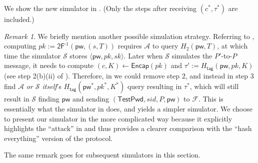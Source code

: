 \documentclass{article}
\theoremstyle{plain}
\theoremstyle{definition}
\theoremstyle{remark}
\newtheorem{remark}{Remark}
\newcommand{\adv}{\mathcal{A}}
\renewcommand{\sim}{\mathcal{S}}
\newcommand{\func}{\mathcal{F}}
\newcommand{\Encap}{\mathsf{Encap}}
\newcommand{\Htag}{H_\mathsf{tag}}
\newcommand{\pw}{\mathsf{pw}}
\newcommand{\TestPwd}{\mathsf{TestPwd}}
\begin{document}
We show the new simulator in . (Only the steps after receiving $(c^*,\tau^*)$ are included.)
\begin{remark}
We briefly mention another possible simulation strategy. Referring to , computing $pk := \mathsf{2F}^{\text{-}1}(\pw,(s,T))$ requires $\adv$ to query $H_2(\pw,T)$, at which time the simulator $\sim$ stores $\langle\pw,pk,sk\rangle$. Later when $\sim$ simulates the $P'$-to-$P$ message, it needs to compute $(c,K) \gets \Encap(pk)$ and $\tau' := \Htag(\pw,pk,K)$ (see step 2(b)(ii) of ). Therefore, in  we could remove step 2, and instead in step 3 find $\adv$ \emph{{\color{blue}or $\sim$ itself}}'s $\Htag(\pw^*,pk^*,K^*)$ query resulting in $\tau^*$, which will still result in $\sim$ finding $\pw$ and sending $(\TestPwd, sid, P, \allowbreak\pw)$ to $\func$. This is essentially what the simulator in \cite{EC:JanRoyXu25} does, and yields a simpler simulator. We choose to present our simulator in the more complicated way because it explicitly highlights the ``attack'' in  and thus provides a clearer comparison with the ``hash everything'' version of the protocol.

The same remark goes for subsequent simulators in this section.
\end{remark}
\end{document}
